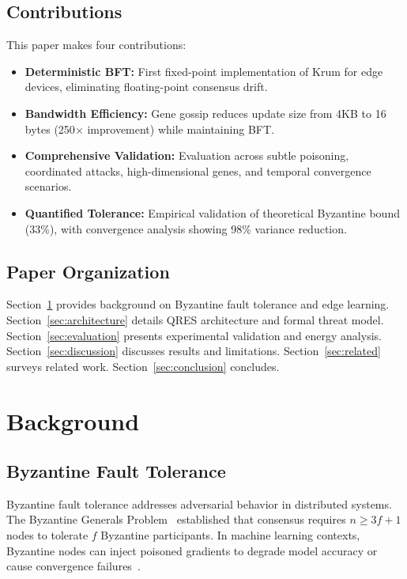 \documentclass[conference,10pt]{IEEEtran}
\begin{document}
\subsection{Contributions}
This paper makes four contributions:
\begin{itemize}
    \item \textbf{Deterministic BFT:} First fixed-point implementation of Krum for edge devices, eliminating floating-point consensus drift.
    \item \textbf{Bandwidth Efficiency:} Gene gossip reduces update size from 4KB to 16 bytes (250$\times$ improvement) while maintaining BFT.
    \item \textbf{Comprehensive Validation:} Evaluation across subtle poisoning, coordinated attacks, high-dimensional genes, and temporal convergence scenarios.
    \item \textbf{Quantified Tolerance:} Empirical validation of theoretical Byzantine bound (33\%), with convergence analysis showing 98\% variance reduction.
\end{itemize}

\subsection{Paper Organization}
Section~\ref{sec:background} provides background on Byzantine fault tolerance and edge learning. Section~\ref{sec:architecture} details QRES architecture and formal threat model. Section~\ref{sec:evaluation} presents experimental validation and energy analysis. Section~\ref{sec:discussion} discusses results and limitations. Section~\ref{sec:related} surveys related work. Section~\ref{sec:conclusion} concludes.

\section{Background}
\label{sec:background}

\subsection{Byzantine Fault Tolerance}
Byzantine fault tolerance addresses adversarial behavior in distributed systems. The Byzantine Generals Problem~\cite{lamport1982byzantine} established that consensus requires $n \geq 3f + 1$ nodes to tolerate $f$ Byzantine participants. In machine learning contexts, Byzantine nodes can inject poisoned gradients to degrade model accuracy or cause convergence failures~\cite{fang2020local}.
\end{document}
